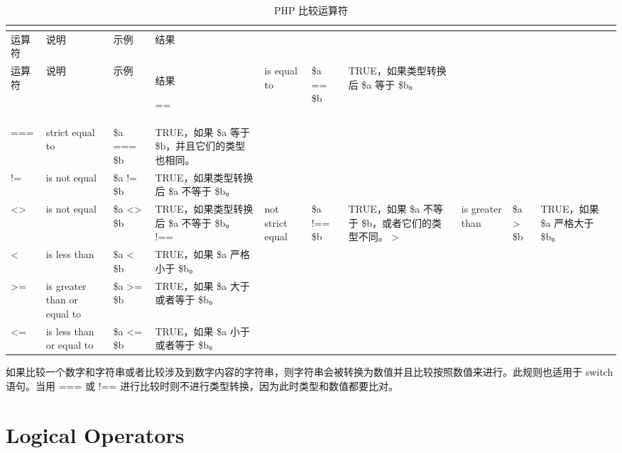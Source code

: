 \begin{longtable}{|m{50pt}|m{80pt}|m{80pt}|m{150pt}|}
\tabularnewline\hline
运算符	&说明	&示例	&结果
\endhead

\caption{PHP 比较运算符}\\
\hline
运算符	&说明	&示例	&结果
\endfirsthead

\endfoot

\endlastfoot
\hline
=\/=	& is equal to&\$a == \$b					&TRUE，如果类型转换后 \$a 等于 \$b。\\
\hline
=\/=\/=& strict equal to&\$a =\/=\/= \$b 		&TRUE，如果 \$a 等于 \$b，并且它们的类型也相同。\\
\hline
!\/=	&is not equal&	\$a != \$b				&TRUE，如果类型转换后 \$a 不等于 \$b。\\
\hline
<\/>&is not equal	&\$a <\/> \$b 			&TRUE，如果类型转换后 \$a 不等于 \$b。
\hline
!==& not strict equal& \$a !== \$b 	&TRUE，如果 \$a 不等于 \$b，或者它们的类型不同。
\hline
>	&is greater than	&\$a > \$b				&TRUE，如果 \$a 严格大于 \$b。\\
\hline
<	&is less than	&\$a < \$b				&TRUE，如果 \$a 严格小于 \$b。\\
\hline
>\/=	&is greater than or equal to &\$a >= \$b&TRUE，如果 \$a 大于或者等于 \$b。\\
\hline
<\/=	&is less than or equal to&\$a <= \$b	&TRUE，如果 \$a 小于或者等于 \$b。\\
\hline

\end{longtable}


如果比较一个数字和字符串或者比较涉及到数字内容的字符串，则字符串会被转换为数值并且比较按照数值来进行。此规则也适用于 switch 语句。当用 === 或 !== 进行比较时则不进行类型转换，因为此时类型和数值都要比对。




\section{Logical Operators}




